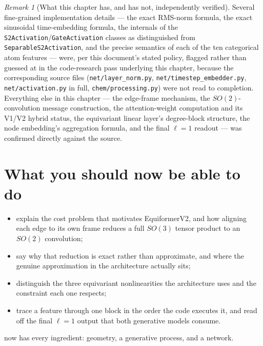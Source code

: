 \documentclass[11pt,a4paper]{report}
\theoremstyle{definition}
\theoremstyle{remark}
\newtheorem{remark}[remark]{Remark}
\newcommand{\file}[1]{\texttt{#1}}
\newcommand{\pyfunc}[1]{\texttt{#1}}
\begin{document}
\begin{remark}[What this chapter has, and has not, independently verified]
Several fine-grained implementation details --- the exact RMS-norm formula,
the exact sinusoidal time-embedding formula, the internals of the
\pyfunc{S2Activation}/\pyfunc{GateActivation} classes as distinguished from
\pyfunc{SeparableS2Activation}, and the precise semantics of each of the
ten categorical atom features --- were, per this document's stated policy,
flagged rather than guessed at in the code-research pass underlying this
chapter, because the corresponding source files (\file{net/layer\_norm.py},
\file{net/timestep\_embedder.py}, \file{net/activation.py} in full,
\file{chem/processing.py}) were not read to completion. Everything else in
this chapter --- the edge-frame mechanism, the $SO(2)$-convolution message
construction, the attention-weight computation and its V1/V2 hybrid status,
the equivariant linear layer's degree-block structure, the node embedding's
aggregation formula, and the final $\ell=1$ readout --- was confirmed
directly against the source.
\end{remark}


\section{What you should now be able to do}

\begin{itemize}[nosep]
\item explain the cost problem that motivates EquiformerV2, and how aligning each edge to its own frame reduces a full $SO(3)$ tensor product to an $SO(2)$ convolution;
\item say why that reduction is exact rather than approximate, and where the genuine approximation in the architecture actually sits;
\item distinguish the three equivariant nonlinearities the architecture uses and the constraint each one respects;
\item trace a feature through one block in the order the code executes it, and read off the final $\ell=1$ output that both generative models consume.
\end{itemize}

 now has every ingredient: geometry, a generative process, and a network.

\clearpage

\end{document}
